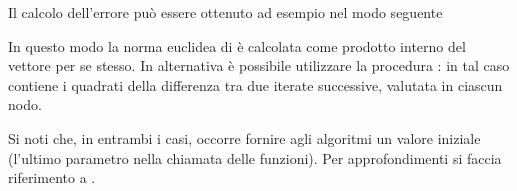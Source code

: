 Il calcolo dell'errore pu\`o essere ottenuto ad esempio nel modo
seguente
\lstset{basicstyle=\scriptsize\sf}

\lstset{basicstyle=\sf}

In questo modo la norma euclidea di  \`e
calcolata come prodotto interno del vettore per se stesso. In
alternativa \`e possibile utilizzare la procedura :
in tal caso  contiene i quadrati della differenza tra
due iterate successive, valutata in ciascun nodo.
\lstset{basicstyle=\scriptsize\sf}

\lstset{basicstyle=\sf}

Si noti che, in entrambi i casi, occorre fornire agli algoritmi un
valore iniziale (l'ultimo parametro nella chiamata delle
funzioni). Per approfondimenti si faccia riferimento a \cite{Josuttis}.
